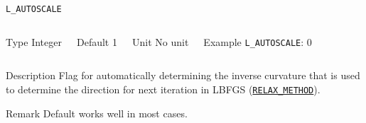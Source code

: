 \documentclass[xcolor=dvipsnames,t]{beamer}
\begin{document}
\begin{frame}[allowframebreaks]{\texttt{L\_AUTOSCALE}} \label{L_AUTOSCALE}
\vspace*{-12pt}
\begin{columns}
\begin{block}{Type}
Integer
\end{block}

\begin{block}{Default}
1
\end{block}

\begin{block}{Unit}
No unit
\end{block}

\begin{block}{Example}
\texttt{L\_AUTOSCALE}: 0
\end{block}
\end{columns}

\begin{block}{Description}
Flag for automatically determining the inverse curvature that is used to determine the direction for next iteration in LBFGS (\hyperlink{RELAX_METHOD}{\texttt{RELAX\_METHOD}}).
\end{block}

\begin{block}{Remark}
Default works well in most cases.
\end{block}

\end{frame}
\end{document}
